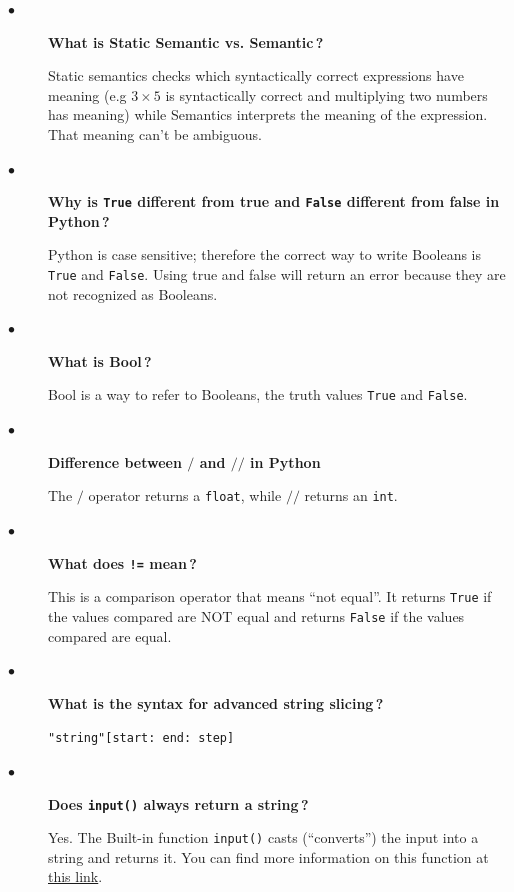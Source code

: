 \documentclass{article}
\newcommand{\inlinecode}[1]{\texttt{#1}}
\newcommand{\link}[2]{\textcolor{blue}{\href{#2}{#1}}}
\newcommand{\question}[1]{\item[$\bullet$] 
	\begin{minipage}[t]{\textwidth}
		\bfseries#1
	\end{minipage}
	\hfil
}
\newenvironment{answer}{}{}
\newenvironment{faq}{\begin{description}}{\end{description}}
\begin{document}
	\begin{faq}
		
		\question{What is Static Semantic vs. Semantic\,?}
		\begin{answer}
			Static semantics checks which syntactically correct expressions have
			meaning (e.g $3 \times 5$ is syntactically correct and multiplying two numbers has
			meaning) while Semantics interprets the meaning of the expression. That
			meaning can't be ambiguous.
		\end{answer}
		
		\question{Why is \inlinecode{True} different from true and \inlinecode{False} different from false in Python\,?}
		\begin{answer}
			Python is case sensitive; therefore the correct way to write Booleans is \inlinecode{True}
			and \inlinecode{False}. Using true and false will return an error because they are not
			recognized as Booleans.
		\end{answer}
		
		\question{What is Bool\,?}
		\begin{answer}
			Bool is a way to refer to Booleans, the truth values \inlinecode{True} and \inlinecode{False}.
		\end{answer}
		
		\question{Difference between $/$ and $//$ in Python}
		\begin{answer}
			The $/$ operator returns a \inlinecode{float}, while $//$ returns an \inlinecode{int}.
		\end{answer}
		
		\question{What does \inlinecode{!=} mean\,?}
		\begin{answer}
			This is a comparison operator that means ``not equal''. It returns \inlinecode{True} if the
			values compared are NOT equal and returns \inlinecode{False} if the values compared
			are equal.
		\end{answer}
		
		\question{What is the syntax for advanced string slicing\,?}
		\begin{answer}
			\inlinecode{"string"[start: end: step]}
		\end{answer}
		
		\question{Does \inlinecode{input()} always return a string\,?}
		\begin{answer}
			Yes. The Built-in function \inlinecode{input()} casts (``converts'') the input into a string and
			returns it. You can find more information on this function at \link{this link}{https://docs.python.org/3/library/functions.html\#input}.
		\end{answer}
		

\end{faq}
\end{document}
